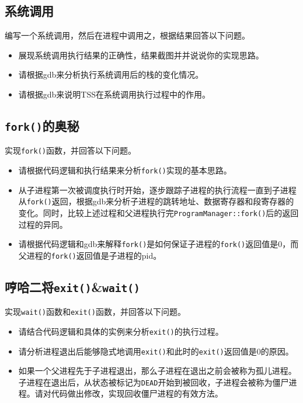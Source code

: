 \subsection{系统调用}
编写一个系统调用，然后在进程中调用之，根据结果回答以下问题。
\begin{itemize}
    \item 展现系统调用执行结果的正确性，结果截图并并说说你的实现思路。
    \item 请根据gdb来分析执行系统调用后的栈的变化情况。
    \item 请根据gdb来说明TSS在系统调用执行过程中的作用。
\end{itemize}
\subsection{\texttt{fork()}的奥秘}
实现\texttt{fork()}函数，并回答以下问题。
\begin{itemize}
    \item 请根据代码逻辑和执行结果来分析\texttt{fork()}实现的基本思路。
    \item 从子进程第一次被调度执行时开始，逐步跟踪子进程的执行流程一直到子进程从\texttt{fork()}返回，根据gdb来分析子进程的跳转地址、数据寄存器和段寄存器的变化。同时，比较上述过程和父进程执行完\texttt{ProgramManager::fork()}后的返回过程的异同。
    \item 请根据代码逻辑和gdb来解释\texttt{fork()}是如何保证子进程的\texttt{fork()}返回值是0，而父进程的\texttt{fork()}返回值是子进程的pid。
\end{itemize}
\subsection{哼哈二将\texttt{exit()}\&\texttt{wait()}}
实现\texttt{wait()}函数和\texttt{exit()}函数，并回答以下问题。
\begin{itemize}
    \item 请结合代码逻辑和具体的实例来分析\texttt{exit()}的执行过程。
    \item 请分析进程退出后能够隐式地调用\texttt{exit()}和此时的\texttt{exit()}返回值是0的原因。
    \item 如果一个父进程先于子进程退出，那么子进程在退出之前会被称为孤儿进程。子进程在退出后，从状态被标记为\texttt{DEAD}开始到被回收，子进程会被称为僵尸进程。请对代码做出修改，实现回收僵尸进程的有效方法。
\end{itemize}
